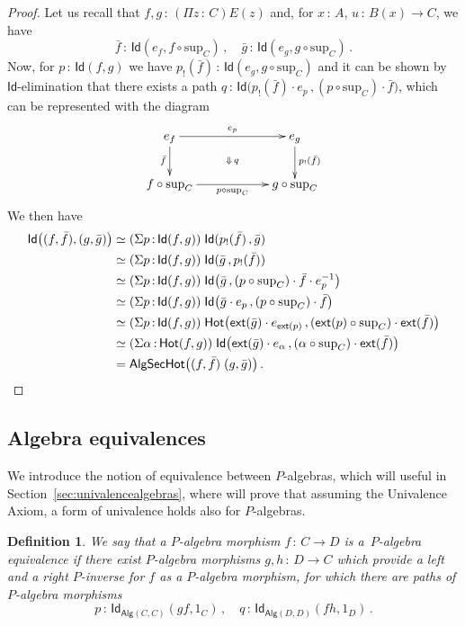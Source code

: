 \documentclass[10pt,a4paper,oneside,reqno]{amsart}
\numberwithin{equation}{section}
\theoremstyle{mythm}
\theoremstyle{mydef}
\newtheorem{definition}[theorem]{Definition}
\theoremstyle{myrmk}
\newcommand{\ie}{\text{i.e.\ }}
\newcommand{\co}{\,{:}\,}
\newcommand{\ct}{\cdot}
\newcommand{\Hot}{\mathsf{Hot}}
\newcommand{\ext}{\mathsf{ext}}
\newcommand{\Id}{\mathsf{Id}}
\newcommand{\Palg}{\mathsf{Alg}}
\renewcommand{\sup}{\mathrm{sup}}
\newcommand{\AlgSecHot}{\mathsf{AlgSecHot}}
\begin{document}
\begin{proof} Let us recall that $f, g \co (\Pi z \co C) E(z)$ and, for $x \co A$, $u \co B(x) \to C$, 
we have
\[
\bar{f} \co  \Id(e_f, f \circ \sup_C ) \, , \quad
\bar{g}\co  \Id( e_g, g \circ \sup_C)  \, .
\]
Now, for $p \co \Id(f, g)$ we have $p_{!}(\bar{f}) \co  \Id( e_g ,  g \circ \sup_C)$ 
and it can be shown by $\Id$-elimination that there exists a path 
$q  \co \Id\big( p_{!}(\bar{f})  \ct e_p  \, , (p \circ \sup_C) \ct \bar{f}  \big)$, 
which can be represented with the diagram
\[
\xymatrix@C=2cm{
e_f  \ar[r]^-{e_p}  \ar[d]_{\bar{f}}  \ar@{}[dr]|{\Downarrow \, q } & e_g  
\ar[d]^{ p_{!}(\bar{f})  }  \\
f \circ \sup_C \ar[r]_-{p \circ \sup_C}  & g \circ \sup_C }
\]
We then have
\begin{align*}
  \Id\big( (f,\bar{f}),  (g,\bar{g}) \big) 
& \simeq (\Sigma p \co \Id( f , g)) \; \Id ( p_{!} ( \bar{f} ) \, , \bar{g}  )  \\
&  \simeq (\Sigma p \co \Id( f , g)) \; \Id (  \bar{g} \, , p_{!} ( \bar{f} )  )  \\
& \simeq (\Sigma p \co \Id( f, g)) 
\; \Id\big(  \bar{g}   \, , 
(p \circ \sup_C) \ct \bar{f} \ct e_p^{-1}  \big)   \\ 
& \simeq (\Sigma p \co \Id( f, g)) 
\; \Id\big(  \bar{g}  \ct e_p  \, ,   (p \circ \sup_C) \ct \bar{f}  \big)   \\ 
& \simeq (\Sigma p \co \Id( f, g)) 
\; \Hot \big(  \ext(\bar{g}) \ct e_{\ext(p)}    \, , 
(\ext(p) \circ \sup_C) \ct \ext(\bar{f})   \big)   \\ 
&  \simeq (\Sigma \alpha \co \Hot( f, g)) \; \Id\big(  \ext(\bar{g})  \ct e_\alpha \, , 
(\alpha \circ \sup_C) \ct \ext(\bar{f}) \big) \\
&  =   \AlgSecHot \big( (f,\bar{f}) \; (g,\bar{g}) \big) \, . \qedhere
\end{align*}  
\end{proof}




\subsection{Algebra equivalences}  We introduce the notion of equivalence between $P$-algebras, which
will useful in Section~\ref{sec:univalencealgebras}, where will prove that assuming the Univalence Axiom, a form of univalence holds also for $P$-algebras. 



\begin{definition}  
We say that a $P$-algebra morphism $f \co C \to D$ is 
 a~\emph{$P$-algebra equivalence}
if there exist $P$-algebra morphisms $g, h \co D \to C$  which provide a left and a right $P$-inverse for $f$ as a
$P$-algebra morphism, \ie for
which there are paths of $P$-algebra morphisms
\[ 
p \co \Id_{\Palg(C,C)}( g  f,  1_C) \, , \quad q \co \Id_{\Palg(D,D)}( f h , 1_D) \, .
\]
\end{definition}
 
\end{document}
